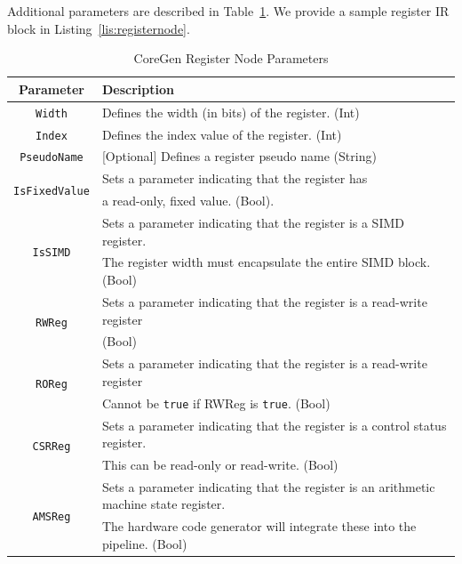 \documentclass{article}
\begin{document}
Additional parameters are described in Table~\ref{tab:RegNodeParams}.  We provide a sample register IR block in Listing~\ref{lis:registernode}.  

\begin{table}[h]
\begin{center}
\caption{CoreGen Register Node Parameters}
\vspace{0.125in}
\label{tab:RegNodeParams}
\begin{tabular}{|c|l|}
\hline
\textbf{Parameter} & \textbf{Description}\\
\hline
\texttt{Width} & Defines the width (in bits) of the register. (Int)\\
\hline
\texttt{Index} & Defines the index value of the register. (Int)\\
\hline
\texttt{PseudoName} & [Optional] Defines a register pseudo name (String)\\
\hline
\multirow{2}{*}{\texttt{IsFixedValue}} & Sets a parameter indicating that the register has\\
                                                                 & a read-only, fixed value. (Bool).\\
\hline
\multirow{2}{*}{\texttt{IsSIMD}} & Sets a parameter indicating that the register is a SIMD register.\\
                                                       & The register width must encapsulate the entire SIMD block. (Bool)\\
\hline
\multirow{2}{*}{\texttt{RWReg}} & Sets a parameter indicating that the register is a read-write register\\&(Bool)\\
\hline
\multirow{2}{*}{\texttt{ROReg}} & Sets a parameter indicating that the register is a read-write register\\
                                                       & Cannot be \texttt{true} if RWReg is \texttt{true}. (Bool)\\
\hline
\multirow{2}{*}{\texttt{CSRReg}} & Sets a parameter indicating that the register is a control status register.\\
                                                          & This can be read-only or read-write. (Bool)\\
\hline
\multirow{2}{*}{\texttt{AMSReg}} & Sets a parameter indicating that the register is an arithmetic machine state register.\\
                                                          & The hardware code generator will integrate these into the pipeline. (Bool)\\

\end{tabular}
\end{center}
\end{table}
\end{document}
